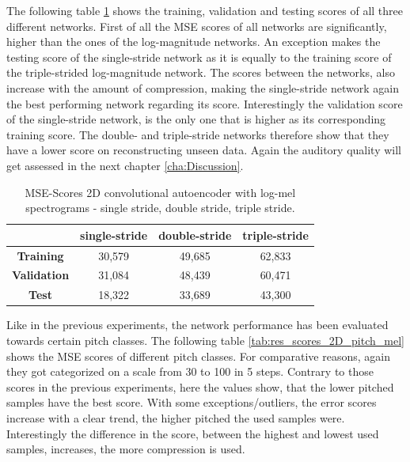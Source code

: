The following table \ref{tab:res_scores_2D_mel} shows the training, validation and testing scores of all three different networks. First of all the MSE scores of all networks are significantly, higher than the ones of the log-magnitude networks. An exception makes the testing score of the single-stride network as it is equally to the training score of the triple-strided log-magnitude network. The scores between the networks, also increase with the amount of compression, making the single-stride network again the best performing network regarding its score. Interestingly the validation score of the single-stride network, is the only one that is higher as its corresponding training score. The double- and triple-stride networks therefore show that they have a lower score on reconstructing unseen data. Again the auditory quality will get assessed in the next chapter \ref{cha:Discussion}.

\begin{table}[htb!]
    \centering
    \captionsetup{justification=centering}
    \begin{tabular}{|c|c|c|c|}
        \hline
         & \textbf{single-stride} & \textbf{double-stride} & \textbf{triple-stride} \\
         \hline
        \textbf{Training} & 30,579 & 49,685 & 62,833 \\
        \hline
        \textbf{Validation} & 31,084 & 48,439 & 60,471\\
        \hline
        \textbf{Test} & 18,322 & 33,689 & 43,300\\
        \hline
    \end{tabular}
    \caption{MSE-Scores 2D convolutional autoencoder with log-mel spectrograms - single stride, double stride, triple stride.}
    \label{tab:res_scores_2D_mel}
\end{table}

Like in the previous experiments, the network performance has been evaluated towards certain pitch classes. The following table \ref{tab:res_scores_2D_pitch_mel} shows the MSE scores of different pitch classes. For comparative reasons, again they got categorized on a scale from 30 to 100 in 5 steps. Contrary to those scores in the previous experiments, here the values show, that the lower pitched samples have the best score. With some exceptions/outliers, the error scores increase with a clear trend, the higher pitched the used samples were. Interestingly the difference in the score, between the highest and lowest used samples, increases, the more compression is used. 

